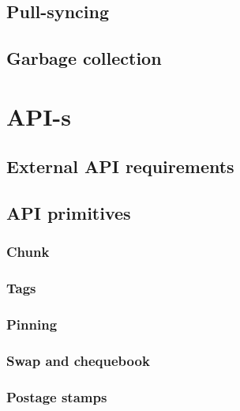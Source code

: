 \section{Pull-syncing  \statusorange}\label{spec:strategy:pull-sync}


\section{Garbage collection \statusorange}\label{spec:strategy:garbage-collection}


\chapter{API-s}\label{spec:api}

\section{External API requirements\statusorange}\label{spec:api:external}



\section{API primitives}\label{spec:api:primitives}

\subsection{Chunk \statusred}\label{spec:api:chunkx}
% 

\subsection{Tags \statusred}\label{spec:api:tags}


\subsection{Pinning
\statusorange}\label{spec:api:pinning}


\subsection{Swap and chequebook\statusorange}\label{spec:api:swap}


\subsection{Postage stamps \statusorange}\label{spec:api:postage}



